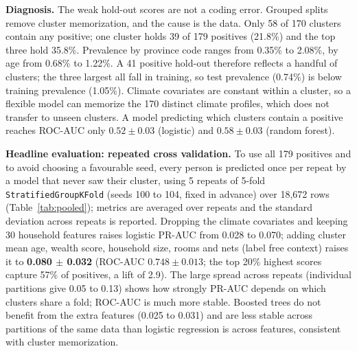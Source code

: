 \documentclass[11pt]{article}
\begin{document}
\textbf{Diagnosis.} The weak hold-out scores are not a coding error. Grouped splits remove cluster memorization, and the cause is the data. Only 58 of 170 clusters contain any positive; one cluster holds 39 of 179 positives (21.8\%) and the top three hold 35.8\%. Prevalence by province code ranges from 0.35\% to 2.08\%, by age from 0.68\% to 1.22\%. A 41 positive hold-out therefore reflects a handful of clusters; the three largest all fall in training, so test prevalence (0.74\%) is below training prevalence (1.05\%). Climate covariates are constant within a cluster, so a flexible model can memorize the 170 distinct climate profiles, which does not transfer to unseen clusters. A model predicting which clusters contain a positive reaches ROC-AUC only $0.52\pm0.03$ (logistic) and $0.58\pm0.03$ (random forest).

\textbf{Headline evaluation: repeated cross validation.} To use all 179 positives and to avoid choosing a favourable seed, every person is predicted once per repeat by a model that never saw their cluster, using 5 repeats of 5-fold \texttt{StratifiedGroupKFold} (seeds 100 to 104, fixed in advance) over 18{,}672 rows (Table~\ref{tab:pooled}); metrics are averaged over repeats and the standard deviation across repeats is reported. Dropping the climate covariates and keeping 30 household features raises logistic PR-AUC from 0.028 to 0.070; adding cluster mean age, wealth score, household size, rooms and nets (label free context) raises it to \textbf{0.080 $\pm$ 0.032} (ROC-AUC $0.748\pm0.013$; the top 20\% highest scores capture 57\% of positives, a lift of 2.9). The large spread across repeats (individual partitions give 0.05 to 0.13) shows how strongly PR-AUC depends on which clusters share a fold; ROC-AUC is much more stable. Boosted trees do not benefit from the extra features (0.025 to 0.031) and are less stable across partitions of the same data than logistic regression is across features, consistent with cluster memorization.
\end{document}
